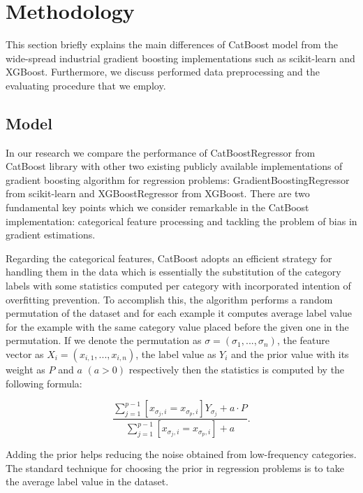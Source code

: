 \section{Methodology}
\label{sec:methodology}

This section briefly explains the main differences of CatBoost model from the wide-spread industrial gradient boosting implementations such as scikit-learn and XGBoost. Furthermore, we discuss performed data preprocessing and the evaluating procedure that we employ.

\subsection{Model}

In our research we compare the performance of CatBoostRegressor from CatBoost library with other two existing publicly available implementations of gradient boosting algorithm for regression problems: GradientBoostingRegressor from scikit-learn and XGBoostRegressor from XGBoost. There are two fundamental key points which we consider remarkable in the CatBoost implementation: categorical feature processing and tackling the problem of bias in gradient estimations. 

Regarding the categorical features, CatBoost adopts an efficient strategy for handling them in the data which is essentially the substitution of the category labels with some statistics computed per category with incorporated intention of overfitting prevention. To accomplish this, the algorithm performs a random permutation of the dataset and for each example it computes average label value for the example with the same category value placed before the given one in the permutation. 
If we denote the permutation as $ \sigma = (\sigma_1, ..., \sigma_n)$, the feature vector as $ X_i = (x_{i, 1}, ..., x_{i, n})$, the label value as $Y_i$ and the prior value with its weight as $P$ and $a$ $(a > 0)$ respectively then the statistics is computed by the following formula:

$$ \frac{\sum_{j=1}^{p-1} [ x_{\sigma_j, i} = x_{\sigma_p, i}] Y_{\sigma_j} + a \cdot P}{\sum_{j=1}^{p-1} [ x_{\sigma_j, i} = x_{\sigma_p, i}] + a }. $$

Adding the prior helps reducing the noise obtained from low-frequency categories. The standard technique for choosing the prior in regression problems is to take the average label value in the dataset.

